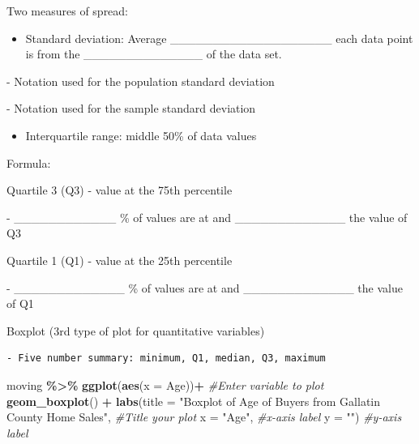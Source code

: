 \documentclass[
]{report}
\newenvironment{Shaded}{\begin{snugshade}}{\end{snugshade}}
\newcommand{\AttributeTok}[1]{\textcolor[rgb]{0.13,0.29,0.53}{#1}}
\newcommand{\CommentTok}[1]{\textcolor[rgb]{0.56,0.35,0.01}{\textit{#1}}}
\newcommand{\FunctionTok}[1]{\textcolor[rgb]{0.13,0.29,0.53}{\textbf{#1}}}
\newcommand{\NormalTok}[1]{#1}
\newcommand{\SpecialCharTok}[1]{\textcolor[rgb]{0.81,0.36,0.00}{\textbf{#1}}}
\newcommand{\StringTok}[1]{\textcolor[rgb]{0.31,0.60,0.02}{#1}}
\providecommand{\tightlist}{%
  \setlength{\itemsep}{0pt}\setlength{\parskip}{0pt}}
\newcommand{\rgi}{\hspace{24pt}}  %
\begin{document}
Two measures of spread:

\begin{itemize}
\tightlist
\item
  Standard deviation: Average \_\_\_\_\_\_\_\_\_\_\_\_\_\_\_\_\_\_\_ each data point is from the \_\_\_\_\_\_\_\_\_\_\_\_\_\_ of the data set.
\end{itemize}

\vspace{1mm}

\rgi \rgi - Notation used for the population standard deviation

\vspace{0.2in}

\rgi \rgi - Notation used for the sample standard deviation

\vspace{0.2in}

\begin{itemize}
\tightlist
\item
  Interquartile range: middle 50\% of data values
\end{itemize}

\rgi Formula:

\rgi \rgi Quartile 3 (Q3) - value at the 75th percentile

\rgi \rgi - \_\_\_\_\_\_\_\_\_\_\_\_ \% of values are at and \_\_\_\_\_\_\_\_\_\_\_\_\_ the value of Q3

\rgi \rgi Quartile 1 (Q1) - value at the 25th percentile

\rgi \rgi - \_\_\_\_\_\_\_\_\_\_\_\_\_ \% of values are at and \_\_\_\_\_\_\_\_\_\_\_\_\_ the value of Q1

\vspace{1mm}


\newpage

Boxplot (3rd type of plot for quantitative variables)

\begin{verbatim}
- Five number summary: minimum, Q1, median, Q3, maximum
\end{verbatim}

\vspace{0.3in}

\begin{Shaded}
\begin{Highlighting}[]
\NormalTok{moving }\SpecialCharTok{\%\textgreater{}\%}
  \FunctionTok{ggplot}\NormalTok{(}\FunctionTok{aes}\NormalTok{(}\AttributeTok{x =}\NormalTok{ Age))}\SpecialCharTok{+} \CommentTok{\#Enter variable to plot}
  \FunctionTok{geom\_boxplot}\NormalTok{() }\SpecialCharTok{+} 
  \FunctionTok{labs}\NormalTok{(}\AttributeTok{title =} \StringTok{"Boxplot of Age of Buyers from Gallatin }
\StringTok{       County Home Sales"}\NormalTok{, }\CommentTok{\#Title your plot}
       \AttributeTok{x =} \StringTok{"Age"}\NormalTok{, }\CommentTok{\#x{-}axis label}
       \AttributeTok{y =} \StringTok{""}\NormalTok{) }\CommentTok{\#y{-}axis label}
\end{Highlighting}
\end{Shaded}
\end{document}

